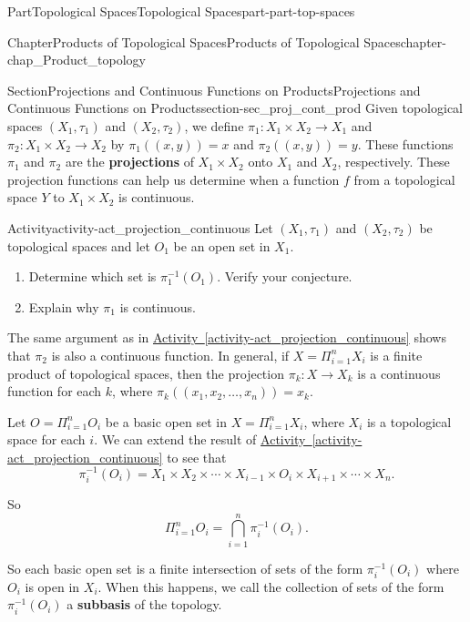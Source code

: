 \documentclass[oneside,10pt,]{book}
\newcommand{\xreffont}{\relax}
\newcommand{\terminology}[1]{\textbf{#1}}
\numberwithin{equation}{chapter}
\begin{document}
\begin{partptx}{Part}{Topological Spaces}{}{Topological Spaces}{}{}{part-part-top-spaces}
\begin{chapterptx}{Chapter}{Products of Topological Spaces}{}{Products of Topological Spaces}{}{}{chapter-chap_Product_topology}
%
\begin{sectionptx}{Section}{Projections and Continuous Functions on Products}{}{Projections and Continuous Functions on Products}{}{}{section-sec_proj_cont_prod}
Given topological spaces \((X_1, \tau_1)\) and \((X_2, \tau_2)\), we define \(\pi_1: X_1 \times X_2 \to X_1\) and \(\pi_2: X_1 \times X_2 \to X_2\) by \(\pi_1((x,y)) = x\) and \(\pi_2((x,y)) = y\). These functions \(\pi_1\) and \(\pi_2\) are the \terminology{projections}  of \(X_1 \times X_2\) onto \(X_1\) and \(X_2\), respectively. These projection functions can help us determine when a function \(f\) from a topological space \(Y\) to \(X_1 \times X_2\) is continuous.%
\begin{activity}{Activity}{}{activity-act_projection_continuous}%
Let \((X_1, \tau_1)\) and \((X_2, \tau_2)\) be topological spaces and let \(O_1\) be an open set in \(X_1\).%
\begin{enumerate}[font=\bfseries,label=(\alph*),ref=\alph*]%
\item{}Determine which set is \(\pi_1^{-1}(O_1)\). Verify your conjecture.%
\item{}Explain why \(\pi_1\) is continuous.%
\end{enumerate}%
\end{activity}%
The same argument as in \hyperref[activity-act_projection_continuous]{Activity~{\xreffont\ref{activity-act_projection_continuous}}} shows that \(\pi_2\) is also a continuous function. In general, if \(X = \Pi_{i=1}^n X_{i}\) is a finite product of topological spaces, then the projection \(\pi_{k}: X \to X_{k}\) is a continuous function for each \(k\), where \(\pi_k((x_1,x_2, \ldots, x_n)) = x_k\).%
\par
Let \(O = \Pi_{i=1}^n O_i\) be a basic open set in \(X = \Pi_{i=1}^n X_i\), where \(X_i\) is a topological space for each \(i\). We can extend the result of \hyperref[activity-act_projection_continuous]{Activity~{\xreffont\ref{activity-act_projection_continuous}}} to see that%
\begin{equation*}
\pi_i^{-1}(O_i) = X_1 \times X_2 \times \cdots \times X_{i-1} \times O_i \times X_{i+1} \times \cdots \times X_n\text{.}
\end{equation*}
%
\par
So%
\begin{equation*}
\Pi_{i=1}^n O_i = \bigcap_{i=1}^n \pi_i^{-1}(O_i)\text{.}
\end{equation*}
%
\par
So each basic open set is a finite intersection of sets of the form \(\pi_i^{-1}(O_i)\) where \(O_i\) is open in \(X_i\). When this happens, we call the collection of sets of the form \(\pi_i^{-1}(O_i)\) a \terminology{subbasis} of the topology.%

\end{sectionptx}
\end{chapterptx}
\end{partptx}
\end{document}
